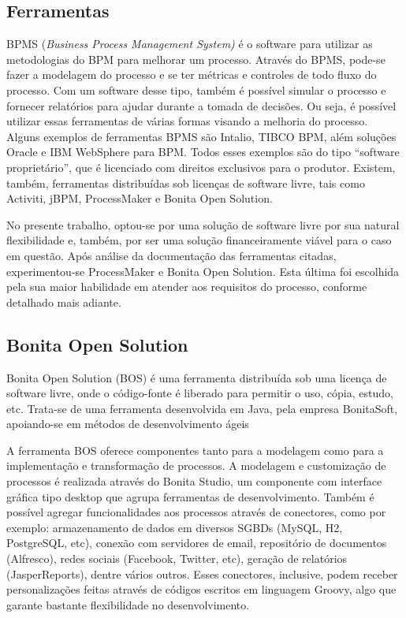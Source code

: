 \documentclass[12pt]{article}
\begin{document}
\subsection{Ferramentas}

BPMS (\emph{Business Process Management System)} é o software para utilizar as metodologias do BPM para melhorar um processo. Através do BPMS, pode-se fazer a modelagem do processo e se ter métricas e controles de todo fluxo do processo. Com um software desse tipo, também é possível simular o processo e fornecer relatórios para ajudar durante a tomada de decisões. Ou seja, é possível utilizar essas ferramentas de várias formas visando a melhoria do processo. Alguns exemplos de ferramentas BPMS são Intalio, TIBCO BPM, além soluções Oracle e IBM WebSphere para BPM. Todos esses exemplos são do tipo “software proprietário”, que é licenciado com direitos exclusivos para o produtor. Existem, também, ferramentas distribuídas sob licenças de software livre, tais como Activiti, jBPM, ProcessMaker e Bonita Open Solution. 

No presente trabalho, optou-se por uma solução de software livre por sua natural flexibilidade e, também, por ser uma solução financeiramente viável para o caso em questão. Após análise da documentação das ferramentas citadas, experimentou-se ProcessMaker e Bonita Open Solution. Esta última foi escolhida pela sua maior habilidade em atender aos requisitos do processo, conforme detalhado mais adiante.

\subsection{Bonita Open Solution}

Bonita Open Solution (BOS) é uma ferramenta distribuída sob uma licença de software livre, onde o código-fonte é liberado para permitir o uso, cópia, estudo, etc. Trata-se de uma ferramenta desenvolvida em Java, pela empresa BonitaSoft, apoiando-se em métodos de desenvolvimento ágeis~\cite{BONITASOFT}

A ferramenta BOS oferece componentes tanto para a modelagem como para a implementação e transformação de processos. A modelagem e customização de processos é realizada através do Bonita Studio, um componente com interface gráfica tipo desktop que agrupa ferramentas de desenvolvimento. Também é possível agregar funcionalidades aos processos através de conectores, como por exemplo: armazenamento de dados em diversos SGBDs (MySQL, H2, PostgreSQL, etc), conexão com servidores de email, repositório de documentos (Alfresco), redes sociais (Facebook, Twitter, etc), geração de relatórios (JasperReports), dentre vários outros. Esses conectores, inclusive, podem receber personalizações feitas através de códigos escritos em linguagem Groovy, algo que garante bastante flexibilidade no desenvolvimento.
\end{document}
